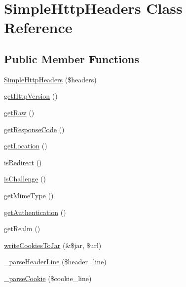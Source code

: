 \hypertarget{class_simple_http_headers}{
\section{SimpleHttpHeaders Class Reference}
\label{class_simple_http_headers}
}
\subsection*{Public Member Functions}
\begin{DoxyCompactItemize}
\item 
\hyperlink{class_simple_http_headers_a95d838d8a7d3964295b444bfe61b454d}{SimpleHttpHeaders} (\$headers)
\item 
\hyperlink{class_simple_http_headers_af88ebe14724e4dbba3471f7cecfdc1ba}{getHttpVersion} ()
\item 
\hyperlink{class_simple_http_headers_ae0349d693484f2c97186736c2ef07476}{getRaw} ()
\item 
\hyperlink{class_simple_http_headers_a58b70d11049e75473cacb60184a0d17a}{getResponseCode} ()
\item 
\hyperlink{class_simple_http_headers_afb6be0a5d90e3430ce86c4ed3f174369}{getLocation} ()
\item 
\hyperlink{class_simple_http_headers_a23809f4cdd1c076084b41b254f4e7408}{isRedirect} ()
\item 
\hyperlink{class_simple_http_headers_a043268e9773ce05afc09292f9cbfd0c3}{isChallenge} ()
\item 
\hyperlink{class_simple_http_headers_a72d3b6a11cf9e6d6e01b7dbea322052c}{getMimeType} ()
\item 
\hyperlink{class_simple_http_headers_a7204275d75685916a8f4b420d3de1d79}{getAuthentication} ()
\item 
\hyperlink{class_simple_http_headers_a62ef0082bc73a8947d66825ab3670819}{getRealm} ()
\item 
\hyperlink{class_simple_http_headers_af217cff62220f93102086b2edc595fee}{writeCookiesToJar} (\&\$jar, \$url)
\item 
\hyperlink{class_simple_http_headers_a86d1882d85c1eaae584389445ac9a817}{\_\-parseHeaderLine} (\$header\_\-line)
\item 
\hyperlink{class_simple_http_headers_a1a67c80f10adc9c369aec874b4af8b1b}{\_\-parseCookie} (\$cookie\_\-line)
\end{DoxyCompactItemize}
